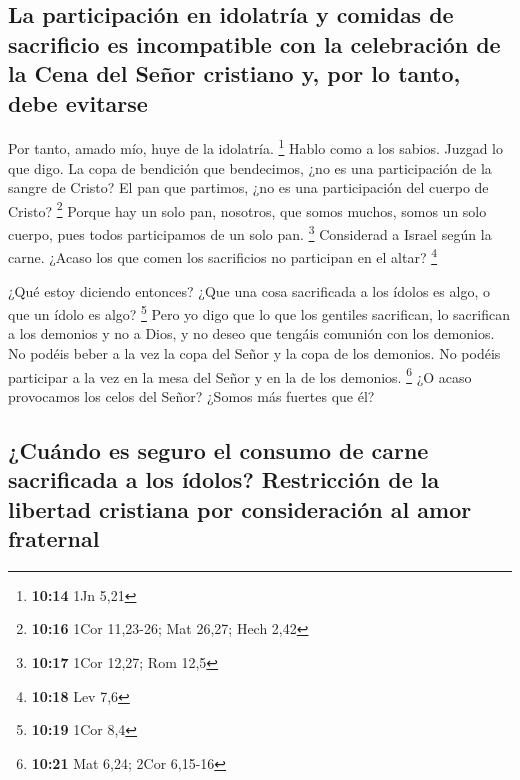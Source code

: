\begin{paracol}{2}
{\subsection{La participación en idolatría y comidas de sacrificio es
incompatible con la celebración de la Cena del Señor cristiano y, por lo
tanto, debe
evitarse}\label{la-participaciuxf3n-en-idolatruxeda-y-comidas-de-sacrificio-es-incompatible-con-la-celebraciuxf3n-de-la-cena-del-seuxf1or-cristiano-y-por-lo-tanto-debe-evitarse}}

 Por tanto, amado mío, huye de la idolatría. \footnote{\textbf{10:14}
  1Jn 5,21}  Hablo como a los sabios. Juzgad lo que digo.
 La copa de bendición que bendecimos, ¿no es una
participación de la sangre de Cristo? El pan que partimos, ¿no es una
participación del cuerpo de Cristo? \footnote{\textbf{10:16} 1Cor
  11,23-26; Mat 26,27; Hech 2,42}  Porque hay un solo
pan, nosotros, que somos muchos, somos un solo cuerpo, pues todos
participamos de un solo pan. \footnote{\textbf{10:17} 1Cor 12,27; Rom
  12,5}  Considerad a Israel según la carne. ¿Acaso los
que comen los sacrificios no participan en el altar? \footnote{\textbf{10:18}
  Lev 7,6}

 ¿Qué estoy diciendo entonces? ¿Que una cosa sacrificada
a los ídolos es algo, o que un ídolo es algo? \footnote{\textbf{10:19}
  1Cor 8,4}  Pero yo digo que lo que los gentiles
sacrifican, lo sacrifican a los demonios y no a Dios, y no deseo que
tengáis comunión con los demonios.  No podéis beber a la
vez la copa del Señor y la copa de los demonios. No podéis participar a
la vez en la mesa del Señor y en la de los demonios. \footnote{\textbf{10:21}
  Mat 6,24; 2Cor 6,15-16}  ¿O acaso provocamos los celos
del Señor? ¿Somos más fuertes que él?

\hypertarget{cuuxe1ndo-es-seguro-el-consumo-de-carne-sacrificada-a-los-uxeddolos-restricciuxf3n-de-la-libertad-cristiana-por-consideraciuxf3n-al-amor-fraternal}{%
\subsection{¿Cuándo es seguro el consumo de carne sacrificada a los
ídolos? Restricción de la libertad cristiana por consideración al amor
fraternal}\label{cuuxe1ndo-es-seguro-el-consumo-de-carne-sacrificada-a-los-uxeddolos-restricciuxf3n-de-la-libertad-cristiana-por-consideraciuxf3n-al-amor-fraternal}}


\end{paracol}
